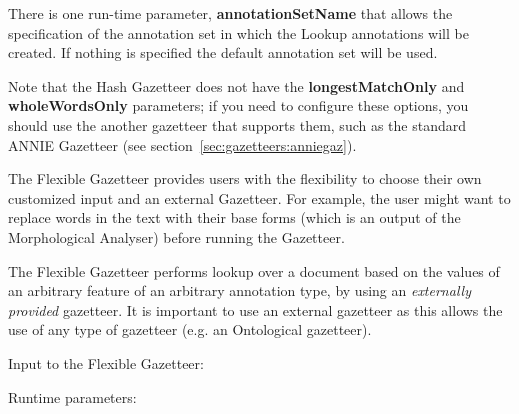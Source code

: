 There is one run-time parameter, \textbf{annotationSetName} that allows 
the specification of the annotation set in which the Lookup annotations
will be created. If nothing is specified the default annotation set
will be used.


Note that the Hash Gazetteer does not have the \textbf{longestMatchOnly} and
\textbf{wholeWordsOnly} parameters; if you need to configure these options, you
should use the another gazetteer that supports them, such as the standard ANNIE
Gazetteer (see section~\ref{sec:gazetteers:anniegaz}).

The Flexible Gazetteer provides users with the flexibility to choose their own
customized input and an external Gazetteer. For example, the user might want to replace
words in the text with their base forms (which is an output of the Morphological
Analyser) before running the Gazetteer.

The Flexible Gazetteer performs lookup over a document based on the
values of an arbitrary feature of an arbitrary annotation type, by using an
\textit{externally provided} gazetteer. It is important to use an external gazetteer as
this allows the use of any type of gazetteer (e.g. an Ontological gazetteer).

Input to the Flexible Gazetteer:

Runtime parameters:

